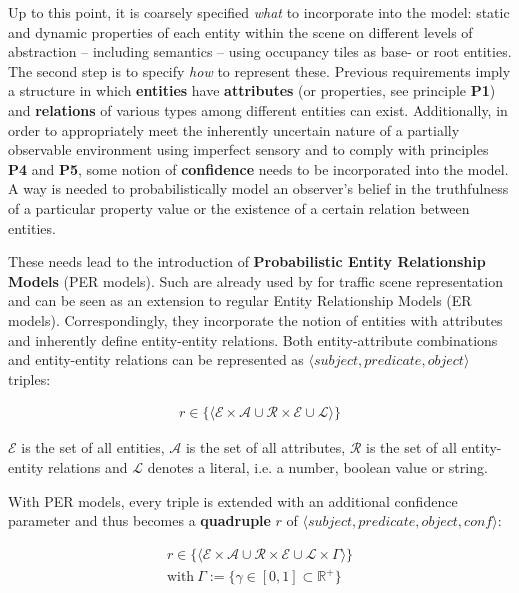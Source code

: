 Up to this point, it is coarsely specified \textit{what} to incorporate into the model: static and dynamic properties of each entity within the scene on different levels of abstraction – including semantics – using occupancy tiles as base- or root entities. The second step is to specify \textit{how} to represent these. Previous requirements imply a structure in which \textbf{entities} have \textbf{attributes} (or properties, see principle \textbf{P1}) and \textbf{relations} of various types among different entities can exist. Additionally, in order to appropriately meet the inherently uncertain nature of a partially observable environment using imperfect sensory and to comply with principles \textbf{P4} and \textbf{P5}, some notion of \textbf{confidence} needs to be incorporated into the model. A way is needed to probabilistically model an observer's belief in the truthfulness of a particular property value or the existence of a certain relation between entities. 

These needs lead to the introduction of \textbf{Probabilistic Entity Relationship Models} (PER models). Such are already used by \cite{Petrich2018} for traffic scene representation and can be seen as an extension to regular Entity Relationship Models (ER models). Correspondingly, they incorporate the notion of entities with attributes and inherently define entity-entity relations. Both entity-attribute combinations and entity-entity relations can be represented as $\langle subject, predicate, object \rangle$ triples:

\begin{gather}
	r \in \{ \langle \mathcal{E} \times \mathcal{A} \cup \mathcal{R} \times \mathcal{E} \cup \mathcal{L} \rangle \}
\end{gather}
\label{eq:triples}

$\mathcal{E}$ is the set of all entities, $\mathcal{A}$ is the set of all attributes, $\mathcal{R}$ is the set of all entity-entity relations and $\mathcal{L}$ denotes a literal, i.e. a number, boolean value or string.

With PER models, every triple is extended with an additional confidence parameter and thus becomes a \textbf{quadruple} $r$ of $\langle subject, predicate, object, \textit{conf} \rangle$: 

\begin{gather}
	r \in \{ \langle \mathcal{E} \times \mathcal{A} \cup \mathcal{R} \times \mathcal{E} \cup \mathcal{L} \times \Gamma \rangle \} \\
	\text{with} \  \Gamma := \{ \gamma \in [0, 1] \subset \mathbb{R}^+ \} \\
\end{gather}
\label{eq:quadruples}


